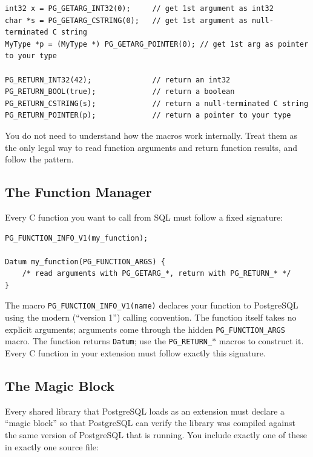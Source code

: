 \documentclass[11pt,a4paper]{article}
\begin{document}
\begin{codebox}
\begin{lstlisting}
int32 x = PG_GETARG_INT32(0);     // get 1st argument as int32
char *s = PG_GETARG_CSTRING(0);   // get 1st argument as null-terminated C string
MyType *p = (MyType *) PG_GETARG_POINTER(0); // get 1st arg as pointer to your type

PG_RETURN_INT32(42);              // return an int32
PG_RETURN_BOOL(true);             // return a boolean
PG_RETURN_CSTRING(s);             // return a null-terminated C string
PG_RETURN_POINTER(p);             // return a pointer to your type
\end{lstlisting}
\end{codebox}

You do not need to understand how the macros work internally. Treat them as the only legal way to read function arguments and return function results, and follow the pattern.

\subsection{The Function Manager}
Every C function you want to call from SQL must follow a fixed signature:

\begin{codebox}
\begin{lstlisting}
PG_FUNCTION_INFO_V1(my_function);

Datum my_function(PG_FUNCTION_ARGS) {
    /* read arguments with PG_GETARG_*, return with PG_RETURN_* */
}
\end{lstlisting}
\end{codebox}

The macro \texttt{PG\_FUNCTION\_INFO\_V1(name)} declares your function to PostgreSQL using the modern (``version 1'') calling convention. The function itself takes no explicit arguments; arguments come through the hidden \texttt{PG\_FUNCTION\_ARGS} macro. The function returns \texttt{Datum}; use the \texttt{PG\_RETURN\_}$*$ macros to construct it. Every C function in your extension must follow exactly this signature.

\subsection{The Magic Block}
Every shared library that PostgreSQL loads as an extension must declare a ``magic block'' so that PostgreSQL can verify the library was compiled against the same version of PostgreSQL that is running. You include exactly one of these in exactly one source file:
\end{document}
